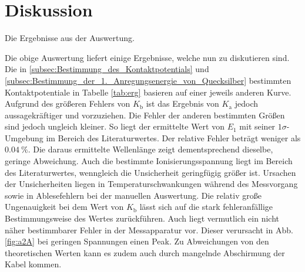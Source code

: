 
\section{Diskussion}
\label{sec:Diskussion}
\begin{table}
	\caption{Die Ergebnisse aus der Auswertung.}
	\centering
	
	\label{tab:erg}
\end{table}
Die obige Auswertung liefert einige Ergebnisse, welche nun zu diskutieren sind.
 Die in \ref{subsec:Bestimmung_des_Kontaktpotentials} und \ref{subsec:Bestimmung_der_1._Anregungsenergie_von_Quecksilber} bestimmten Kontaktpotentiale in Tabelle \ref{tab:erg} basieren auf einer
jeweils anderen Kurve. Aufgrund des größeren Fehlers von $K_\text{b}$ ist das
Ergebnis von $K_\text{a}$ jedoch aussagekräftiger und vorzuziehen. Die Fehler der anderen bestimmten
Größen sind jedoch ungleich kleiner.
So liegt der ermittelte Wert von $E_1$ mit seiner $1\sigma$-Umgebung im
Bereich des Literaturwertes. Der relative Fehler beträgt weniger als $\SI{0.04}{\percent}$.
Die daraus ermittelte Wellenlänge zeigt dementsprechend dieselbe, geringe Abweichung. Auch die
 bestimmte Ionisierungsspannung liegt im Bereich des Literaturwertes, wenngleich die Unsicherheit geringfügig größer ist.
Ursachen der Unsicherheiten liegen in Temperaturschwankungen während des
Messvorgang sowie in Ablesefehlern bei der manuellen Auswertung. Die relativ
große Ungenauigkeit bei dem Wert von $K_\text{b}$ lässt sich auf die stark fehleranfällige Bestimmungsweise des Wertes zurückführen. Auch liegt vermutlich ein nicht näher bestimmbarer Fehler in der Messapparatur vor. Dieser verursacht in Abb. \ref{fig:a2A} bei geringen Spannungen einen Peak. Zu Abweichungen von den theoretischen Werten kann es zudem auch durch mangelnde Abschirmung der Kabel kommen.
